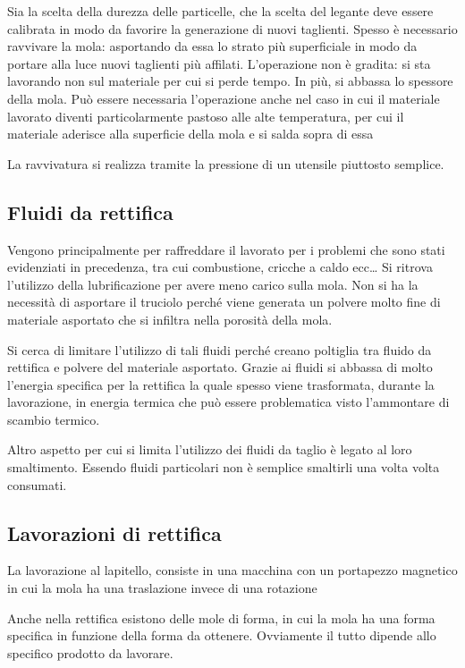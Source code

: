 Sia la scelta della durezza delle particelle, che la scelta del legante deve essere calibrata in modo da favorire la generazione di nuovi taglienti.
Spesso è necessario ravvivare la mola: asportando da essa lo strato più superficiale in modo da portare alla luce nuovi taglienti più affilati.
L'operazione non è gradita: si sta lavorando non sul materiale per cui si perde tempo. In più, si abbassa lo spessore della mola.
Può essere necessaria l'operazione anche nel caso in cui il materiale lavorato diventi particolarmente pastoso alle alte temperatura, per cui il materiale aderisce alla superficie della mola e si salda sopra di essa

La ravvivatura si realizza tramite la pressione di un utensile piuttosto semplice.

\subsection{Fluidi da rettifica}
Vengono principalmente per raffreddare il lavorato per i problemi che sono stati evidenziati in precedenza, tra cui combustione, cricche a caldo ecc\dots
Si ritrova l'utilizzo della lubrificazione per avere meno carico sulla mola.
Non si ha la necessità di asportare il truciolo perché viene generata un polvere molto fine di materiale asportato che si infiltra nella porosità della mola.

Si cerca di limitare l'utilizzo di tali fluidi perché creano poltiglia tra fluido da rettifica e polvere del materiale asportato.
Grazie ai fluidi si abbassa di molto l'energia specifica per la rettifica la quale spesso viene trasformata, durante la lavorazione, in energia termica che può essere problematica visto l'ammontare di scambio termico.

Altro aspetto per cui si limita l'utilizzo dei fluidi da taglio è legato al loro smaltimento. Essendo fluidi particolari non è semplice smaltirli una volta volta consumati.

\subsection{Lavorazioni di rettifica}

La lavorazione al lapitello, consiste in una macchina con un portapezzo magnetico in cui la mola ha una traslazione invece di una rotazione

Anche nella rettifica esistono delle mole di forma, in cui la mola ha una forma specifica in funzione della forma da ottenere.
Ovviamente il tutto dipende allo specifico prodotto da lavorare.


